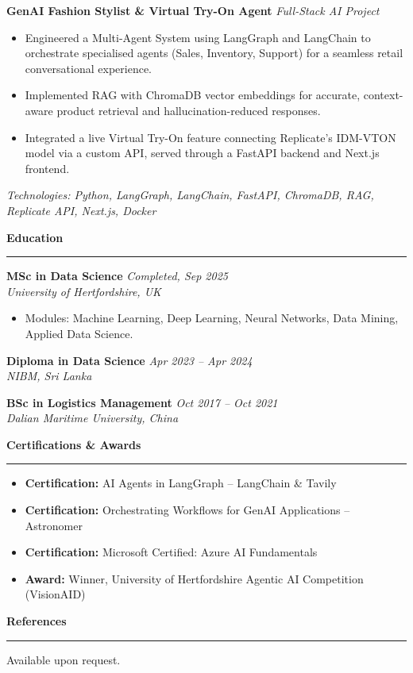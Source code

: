 \documentclass[a4paper,10pt]{article}
\newcommand{\sect}[1]{\vspace{8pt}\noindent\textbf{\color{heading}\large #1}\vspace{3pt}\hrule\vspace{6pt}}
\begin{document}
\noindent\textbf{GenAI Fashion Stylist \& Virtual Try-On Agent} \hfill \textit{Full-Stack AI Project}
\begin{itemize}[leftmargin=*, topsep=4pt, itemsep=2pt]
    \item Engineered a Multi-Agent System using LangGraph and LangChain to orchestrate specialised agents (Sales, Inventory, Support) for a seamless retail conversational experience.
    \item Implemented RAG with ChromaDB vector embeddings for accurate, context-aware product retrieval and hallucination-reduced responses.
    \item Integrated a live Virtual Try-On feature connecting Replicate's IDM-VTON model via a custom API, served through a FastAPI backend and Next.js frontend.
\end{itemize}
\textit{Technologies: Python, LangGraph, LangChain, FastAPI, ChromaDB, RAG, Replicate API, Next.js, Docker}

\sect{Education}
\noindent\textbf{MSc in Data Science} \hfill \textit{Completed, Sep 2025} \\
\textit{University of Hertfordshire, UK}
\begin{itemize}[leftmargin=*, topsep=2pt, itemsep=0pt]
    \item Modules: Machine Learning, Deep Learning, Neural Networks, Data Mining, Applied Data Science.
\end{itemize}
\vspace{4pt}

\noindent\textbf{Diploma in Data Science} \hfill \textit{Apr 2023 -- Apr 2024} \\
\textit{NIBM, Sri Lanka}
\vspace{4pt}

\noindent\textbf{BSc in Logistics Management} \hfill \textit{Oct 2017 -- Oct 2021} \\
\textit{Dalian Maritime University, China}

\sect{Certifications \& Awards}
\begin{itemize}[leftmargin=*, itemsep=0pt, parsep=0pt, topsep=2pt]
    \item \textbf{Certification:} AI Agents in LangGraph -- LangChain \& Tavily
    \item \textbf{Certification:} Orchestrating Workflows for GenAI Applications -- Astronomer
    \item \textbf{Certification:} Microsoft Certified: Azure AI Fundamentals
    \item \textbf{Award:} Winner, University of Hertfordshire Agentic AI Competition (VisionAID)
\end{itemize}

\sect{References}
Available upon request.
\end{document}
